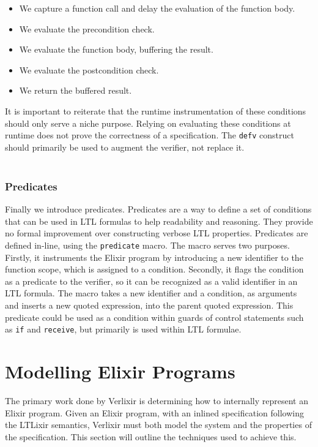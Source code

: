 \begin{itemize}
    \item We capture a function call and delay the evaluation of the function body.
    \item We evaluate the precondition check.
    \item We evaluate the function body, buffering the result.
    \item We evaluate the postcondition check.
    \item We return the buffered result.
\end{itemize}
It is important to reiterate that the runtime instrumentation of these conditions should only serve a niche purpose. Relying on evaluating these conditions at runtime does not prove the correctness of a specification. The \texttt{defv} construct should primarily be used to augment the verifier, not replace it.
\\ \\
\subsubsection{Predicates}
Finally we introduce predicates. Predicates are a way to define a set of conditions that can be used in LTL formulas to help readability and reasoning. They provide no formal improvement over constructing verbose LTL properties. Predicates are defined in-line, using the \texttt{predicate} macro. The macro serves two purposes. Firstly, it instruments the Elixir program by introducing a new identifier to the function scope, which is assigned to a condition. Secondly, it flags the condition as a predicate to the verifier, so it can be recognized as a valid identifier in an LTL formula. The macro takes a new identifier and a condition, as arguments and inserts a new quoted expression, into the parent quoted expression. This predicate could be used as a condition within guards of control statements such as \texttt{if} and \texttt{receive}, but primarily is used within LTL formulae.

\section{Modelling Elixir Programs} \label{sec:modelling_elixir_programs}
The primary work done by Verlixir is determining how to internally represent an Elixir program. Given an Elixir program, with an inlined specification following the LTLixir semantics, Verlixir must both model the system and the properties of the specification. This section will outline the techniques used to achieve this.
